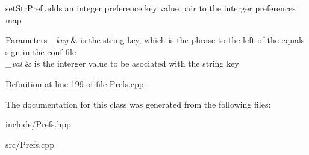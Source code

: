 set\+Str\+Pref adds an integer preference key value pair to the interger preferences map 


\begin{DoxyParams}{Parameters}
{\em \+\_\+key} & is the string key, which is the phrase to the left of the equals sign in the conf file \\
\hline
{\em \+\_\+val} & is the interger value to be asociated with the string key \\
\hline
\end{DoxyParams}


Definition at line 199 of file Prefs.\+cpp.



The documentation for this class was generated from the following files\+:\begin{DoxyCompactItemize}
\item 
include/Prefs.\+hpp\item 
src/Prefs.\+cpp\end{DoxyCompactItemize}
